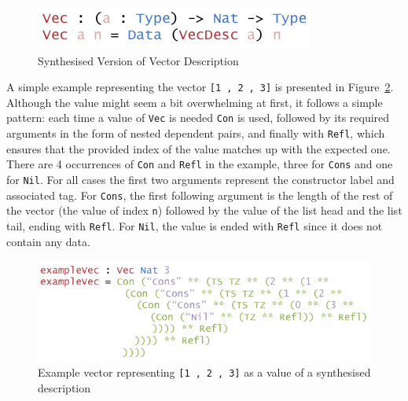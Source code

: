 \documentclass{ituthesis}
\newcommand{\ttconstructor}[1]{\textcolor{constructor-color}{\texttt{#1}}}
\newcommand{\ttdec}[1]{\textcolor{declared-var-color}{\texttt{#1}}}
\newcommand{\ttvar}[1]{\textcolor{local-var-color}{\texttt{#1}}}
\newcommand{\ttliteral}[1]{\textcolor{literal-color}{\texttt{#1}}}
\theoremstyle{break}
\begin{document}
\begin{figure}[ht]
\begin{center}
    \includegraphics[scale=0.5]{Figures/VectorSynthesisedDesc.png}
\end{center}
\caption{Synthesised Version of Vector Description}
\label{fig:synthversvecdesc}
\end{figure}

A simple example representing the vector \ttconstructor{[}\ttliteral{1}~\ttconstructor{,}~\ttliteral{2}~\ttconstructor{,}~\ttliteral{3}\ttconstructor{]} is presented in Figure~\ref{fig:exmvecsynthvecdesc}. Although the value might seem a bit overwhelming at first, it follows a simple pattern:
each time a value of \ttdec{Vec} is needed \ttconstructor{Con} is used, followed by its required arguments in the form of nested dependent pairs, and finally with \ttconstructor{Refl}, which ensures
that the provided index of the value matches up with the expected one.
There are 4 occurrences of \ttconstructor{Con} and \ttconstructor{Refl} in the example, three for  \ttconstructor{Cons} and one for \ttconstructor{Nil}.
For all cases the first two arguments represent the constructor label and associated tag. 
For \ttconstructor{Cons}, the first following argument is the length of the rest of the vector (the value of index \ttvar{n}) followed by the value of the list head and the list tail, ending with \ttconstructor{Refl}.
For \ttconstructor{Nil}, the value is ended with \ttconstructor{Refl} since it does not contain any data.


\begin{figure}[ht]
\begin{center}
    \includegraphics[scale=0.5]{Figures/VectorSynthesisedExample.png}
\end{center}
\caption{Example vector representing \ttconstructor{[}\ttliteral{1}~\ttconstructor{,}~\ttliteral{2}~\ttconstructor{,}~\ttliteral{3}\ttconstructor{]} as a value of a synthesised description}
\label{fig:exmvecsynthvecdesc}
\end{figure}
\end{document}
